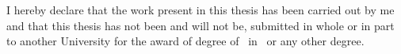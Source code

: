 
I hereby declare that the work present in this thesis has been carried out by me and that this thesis has not been and will not be, submitted in whole or in part to another University for the award of degree of \emph{\degree}~in \emph{\degreeSubject}~or any other degree.

\cleardoublepage